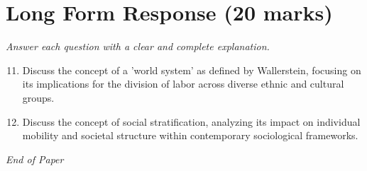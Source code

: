 \documentclass[12pt]{article}
\begin{document}
\section*{Long Form Response (20 marks)}
\textit{Answer each question with a clear and complete explanation.}
\begin{enumerate}[label=\arabic*.]
\setcounter{enumi}{10}
\item Discuss the concept of a 'world system' as defined by Wallerstein, focusing on its implications for the division of labor across diverse ethnic and cultural groups.
\item Discuss the concept of social stratification, analyzing its impact on individual mobility and societal structure within contemporary sociological frameworks.
\end{enumerate}

\vfill
\noindent\textit{End of Paper}
\end{document}
